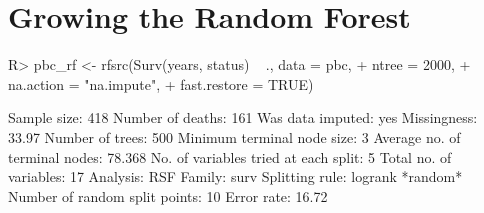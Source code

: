 \documentclass[nojss]{jss}\usepackage[]{graphicx}\usepackage[]{color}
\begin{document}

\section{Growing the Random Forest}


\begin{Schunk}
\begin{Sinput}
R> pbc_rf <- rfsrc(Surv(years, status) ~ ., data = pbc, 
+          ntree = 2000, 
+          na.action = "na.impute", 
+          fast.restore = TRUE)
\end{Sinput}
\end{Schunk}


\begin{Schunk}
\begin{Soutput}
                         Sample size: 418
                    Number of deaths: 161
                    Was data imputed: yes
                         Missingness: 33.97%
                     Number of trees: 500
          Minimum terminal node size: 3
       Average no. of terminal nodes: 78.368
No. of variables tried at each split: 5
              Total no. of variables: 17
                            Analysis: RSF
                              Family: surv
                      Splitting rule: logrank *random*
       Number of random split points: 10
                          Error rate: 16.72%
\end{Soutput}
\end{Schunk}
\end{document}
